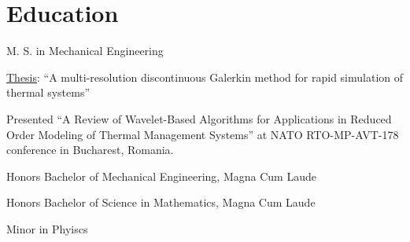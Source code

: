 \section{Education}
%
\begin{position}
  \begin{myitem}
  \item M. S. in Mechanical Engineering
  \item \href{https://smartech.gatech.edu/bitstream/handle/1853/42775/gempesaw_daniel_j_201112_mast.pdf?sequence=1p}{Thesis}: ``A multi-resolution discontinuous Galerkin method for rapid simulation of thermal systems''
  \item Presented ``A Review of Wavelet-Based Algorithms for Applications in Reduced Order Modeling of Thermal Management Systems'' at NATO RTO-MP-AVT-178 conference in Bucharest, Romania.
  \end{myitem}
  \begin{myitem}
  \item Honors Bachelor of Mechanical Engineering, Magna Cum Laude
  \item Honors Bachelor of Science in Mathematics, Magna Cum Laude
  \item Minor in Phyiscs
  \end{myitem}
\end{position}
